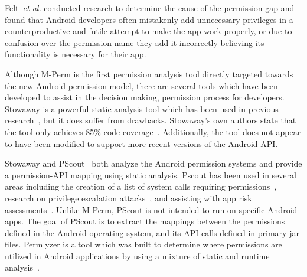\documentclass{sig-alternate-05-2015}
\begin{document}
Felt~\emph{et al.}\cite{Felt:2011:APD:2046707.2046779} conducted research to determine the cause of the permission gap and found that Android developers often mistakenly add unnecessary privileges in a counterproductive and futile attempt to make the app work properly, or due to confusion over the permission name they add it incorrectly believing its functionality is necessary for their app.


Although M-Perm is the first permission analysis tool directly targeted towards the new Android permission model, there are several tools which have been developed to assist in the decision making, permission process for developers. Stowaway is a powerful static analysis tool which has been used in previous research~\cite{Pearce:2012:APS:2414456.2414498,Stevens_investigatinguser,jeon2011dr}, but it does suffer from drawbacks. Stowaway's own authors state that the tool only achieves 85\% code coverage~\cite{Felt:2011:APD:2046707.2046779}. Additionally, the tool does not appear to have been modified to support more recent versions of the Android API.

Stowaway and PScout~\cite{Au:2012:PAA:2382196.2382222} both analyze the Android permission systems and provide a permission-API mapping using static analysis. Pscout has been used in several areas including the creation of a list of system calls requiring permissions~\cite{book2013longitudinal,6693128}, research on privilege escalation attacks~\cite{Au:2012:PAA:2382196.2382222}, and assisting with app risk assessments~\cite{pandita2013whyper}. Unlike M-Perm, PScout is not intended to run on specific Android apps. The goal of PScout is to extract the mappings between the permissions defined in the Android operating system, and its API calls defined in primary jar files. Permlyzer is a tool which was built to determine where permissions are utilized in Android applications by using a mixture of static and runtime analysis~\cite{6698893}.


\end{document}
